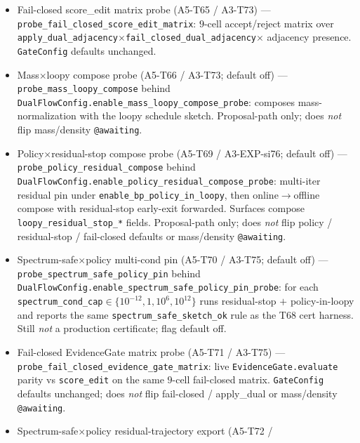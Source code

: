 \documentclass[11pt]{article}
\begin{document}
\begin{itemize}[leftmargin=1.5em]
  \texttt{DualFlowConfig.enable\_loopy\_bp\_spectrum\_safe\_cert}: runs
  the residual-stop early-exit path and reports
  \texttt{spectrum\_safe\_sketch\_ok} only when stop reason is
  \texttt{abs\_tol}/\texttt{plateau}, no ridge was applied, and residuals
  are finite non-negative. \emph{Not} a production certificate.
  \item Fail-closed score\_edit matrix probe (A5-T65 / A3-T73) ---
  \texttt{probe\_fail\_closed\_score\_edit\_matrix}: $9$-cell
  accept/reject matrix over
  \texttt{apply\_dual\_adjacency}$\times$\texttt{fail\_closed\_dual\_adjacency}$\times$
  adjacency presence. \texttt{GateConfig} defaults unchanged.
  \item Mass$\times$loopy compose probe (A5-T66 / A3-T73; default off)
  --- \texttt{probe\_mass\_loopy\_compose} behind
  \texttt{DualFlowConfig.enable\_mass\_loopy\_compose\_probe}: composes
  mass-normalization with the loopy schedule sketch. Proposal-path only;
  does \emph{not} flip mass/density \texttt{@awaiting}.
  \item Policy$\times$residual-stop compose probe (A5-T69 /
  A3-EXP-si76; default off) ---
  \texttt{probe\_policy\_residual\_compose} behind
  \texttt{DualFlowConfig.enable\_policy\_residual\_compose\_probe}:
  multi-iter residual pin under \texttt{enable\_bp\_policy\_in\_loopy},
  then online$\to$offline compose with residual-stop early-exit
  forwarded. Surfaces compose \texttt{loopy\_residual\_stop\_*} fields.
  Proposal-path only; does \emph{not} flip policy / residual-stop /
  fail-closed defaults or mass/density \texttt{@awaiting}.
  \item Spectrum-safe$\times$policy multi-cond pin (A5-T70 /
  A3-T75; default off) ---
  \texttt{probe\_spectrum\_safe\_policy\_pin} behind
  \texttt{DualFlowConfig.enable\_spectrum\_safe\_policy\_pin\_probe}:
  for each \texttt{spectrum\_cond\_cap}$\in\{10^{-12},1,10^{6},10^{12}\}$
  runs residual-stop $+$ policy-in-loopy and reports the same
  \texttt{spectrum\_safe\_sketch\_ok} rule as the T68 cert harness.
  Still \emph{not} a production certificate; flag default off.
  \item Fail-closed EvidenceGate matrix probe (A5-T71 / A3-T75)
  --- \texttt{probe\_fail\_closed\_evidence\_gate\_matrix}: live
  \texttt{EvidenceGate.evaluate} parity vs \texttt{score\_edit} on the
  same $9$-cell fail-closed matrix. \texttt{GateConfig} defaults
  unchanged; does \emph{not} flip fail-closed / apply\_dual or
  mass/density \texttt{@awaiting}.
  \item Spectrum-safe$\times$policy residual-trajectory export (A5-T72 /

\end{itemize}
\end{document}
